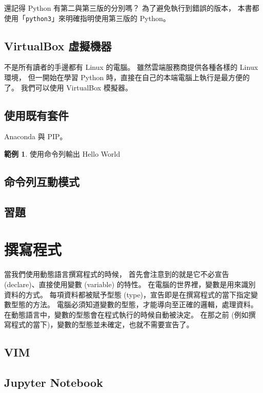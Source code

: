 \documentclass[a4paper,12pt]{book}
\theoremstyle{definition}
\newtheorem{example}{範例}[chapter]
\begin{document}
還記得 Python 有第二與第三版的分別嗎？
為了避免執行到錯誤的版本，
本書都使用「\verb+python3+」來明確指明使用第三版的 Python。

\section{VirtualBox 虛擬機器}
%
\label{c:runtime:vbox}

不是所有讀者的手邊都有 Linux 的電腦。
雖然雲端服務商提供各種各樣的 Linux 環境，
但一開始在學習 Python 時，直接在自己的本端電腦上執行是最方便的了。
我們可以使用 VirtualBox 模擬器。

\section{使用既有套件}

Anaconda 與 PIP。

\begin{example}
使用命令列輸出 Hello World
\end{example}

\section{命令列互動模式}

\section{習題}

\chapter{撰寫程式}
%
\label{c:write}

當我們使用動態語言撰寫程式的時候，
首先會注意到的就是它不必宣告 (declare)、直接使用變數 (variable) 的特性。
在電腦的世界裡，變數是用來識別資料的方式。
每項資料都被賦予型態 (type)，宣告即是在撰寫程式的當下指定變數型態的方法。
電腦必須知道變數的型態，才能導向至正確的邏輯，處理資料。
在動態語言中，變數的型態會在程式執行的時候自動被決定。
在那之前 (例如撰寫程式的當下)，變數的型態並未確定，也就不需要宣告了。

\section{VIM}

\section{Jupyter Notebook}
\end{document}
